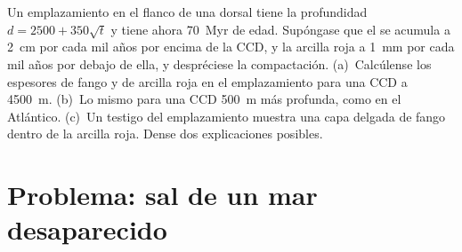 \begin{exercise}[$\star\star\star$]\label{exo:b1:chemical-biogenic-sediments:12}
Un emplazamiento en el flanco de una dorsal tiene la profundidad $d = 2500 + 350\sqrt t$ y tiene ahora \qty{70}{Myr} de edad. Supóngase que el  se acumula a \qty{2}{cm} por cada
mil años por encima de la CCD, y la arcilla roja a \qty{1}{mm} por cada mil años por debajo de ella, y despréciese la compactación. (a)~Calcúlense los espesores de fango y de arcilla roja en el
emplazamiento para una CCD a \qty{4500}{m}. (b)~Lo mismo para una CCD \qty{500}{m} más profunda, como en el Atlántico. (c)~Un testigo del emplazamiento muestra una capa delgada de fango dentro
de la arcilla roja. Dense dos explicaciones posibles.
\end{exercise}

\section{Problema: sal de un mar desaparecido}

